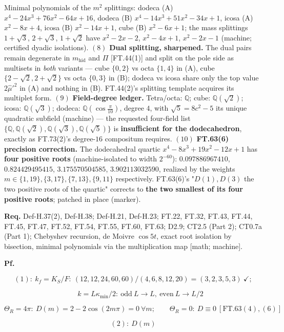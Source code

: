 \begin{theorem}
Minimal polynomials of the $m^2$ splittings: dodeca (A) $x^4-24x^3+76x^2-64x+16$, dodeca (B) $x^4-14x^3+51x^2-34x+1$, icosa (A) $x^2-8x+4$, icosa (B) $x^2-14x+1$, cube (B) $x^2-6x+1$; the mass splittings $1{+}\sqrt3$, $2{+}\sqrt3$, $1{+}\sqrt2$ have $x^2-2x-2$, $x^2-4x+1$, $x^2-2x-1$ (machine; certified dyadic isolations). $(8)$ \textbf{Dual splitting, sharpened.} The dual pairs remain degenerate in $m_{\mathrm{hid}}$ and $\Pi$ [FT.44(1)] and split on the pole side as multisets in \textit{both} variants — cube $\{0,2\}$ vs octa $\{1,4\}$ in (A), cube $\{2{-}\sqrt2,2{+}\sqrt2\}$ vs octa $\{0,3\}$ in (B); dodeca vs icosa share only the top value $2\hat\mu'^2$ in (A) and nothing in (B). FT.44(2)'s splitting template acquires its multiplet form. $(9)$ \textbf{Field-degree ledger.} Tetra/octa: $\mathbb Q$; cube: $\mathbb Q(\sqrt2)$; icosa: $\mathbb Q(\sqrt3)$; dodeca: $\mathbb Q(\cos\tfrac\pi{10})$, degree $4$, with $\sqrt5=8c^2-5$ its unique quadratic subfield (machine) — the requested four-field list $\{\mathbb Q,\mathbb Q(\sqrt2),\mathbb Q(\sqrt3),\mathbb Q(\sqrt5)\}$ is \textbf{insufficient for the dodecahedron}, exactly as FT.73(2)'s degree-$16$ compositum requires. $(10)$ \textbf{FT.63(6) precision correction.} The dodecahedral quartic $x^4-8x^3+19x^2-12x+1$ has \textbf{four positive roots} (machine-isolated to width $2^{-60}$): $0.097886967410$, $0.824429495415$, $3.175570504585$, $3.902113032590$, realized by the weights $m\in\{1,19\},\{3,17\},\{7,13\},\{9,11\}$ respectively. FT.63(6)'s "$D(1),D(3)$ the two positive roots of the quartic" corrects to \textbf{the two smallest of its four positive roots}; patched in place (marker).

\textbf{Req.} Def-H.37(2), Def-H.38; Def-H.21, Def-H.23; FT.22, FT.32, FT.43, FT.44, FT.45, FT.47, FT.52, FT.54, FT.55, FT.60, FT.63; D2.9; CT2.5 (Part 2); CT0.7a (Part 1); Chebyshev recursion, de Moivre $\cos5t$, exact root isolation by bisection, minimal polynomials via the multiplication map [math; machine].

\textbf{Pf.}

\[
(1):\ k_f=K_S/F:\ (12,12,24,60,60)/(4,6,8,12,20)=(3,2,3,5,3)\ \checkmark;
\]

\[
\qquad k=L\kappa_{\min}/2:\ \text{odd}\ L\to L,\ \text{even}\ L\to L/2
\]

\[
\Theta_R=4\pi:\ D(m)=2-2\cos(2m\pi)=0\ \forall m;\qquad\Theta_R=0:\ D\equiv0\ [\mathrm{FT.63}(4),(6)]
\]

\[
(2):\ D(m)
\]


\end{theorem}
